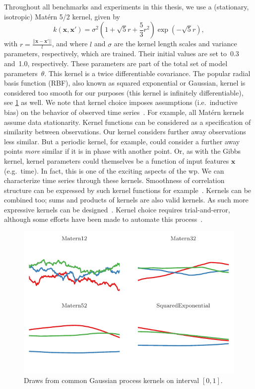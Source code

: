 Throughout all benchmarks and experiments in this thesis, we use a (stationary, isotropic) Matérn 5/2 kernel, given by
\begin{equation}
  \label{eq:matern}
  k(\textbf{x}, \textbf{x}') = \sigma^2 (1 + \sqrt{5} r + \frac53 r^2) \exp(-\sqrt{5}r),
\end{equation}
with $r = \frac{||\textbf{x} - \textbf{x}'||}{l}$, and where $l$ and $\sigma$ are the kernel length scales and variance parameters, respectively, which are trained.
Their initial values are set to~0.3 and~1.0, respectively.
These parameters are part of the total set of model parameters~$\theta$.
This kernel is a twice differentiable covariance.
The popular radial basis function (RBF), also known as squared exponential or Gaussian, kernel is considered too smooth for our purposes (this kernel is infinitely differentiable), see \cref{fig:kernel-draws} as well.
We note that kernel choice imposes assumptions (i.e.~inductive bias) on the behavior of observed time series~\parencite[see also][chapter 2]{Duvenaud2014}.
For example, all Matérn kernels assume data stationarity.
Kernel functions can be considered as a specification of similarity between observations.
Our kernel considers further away observations less similar.
But a periodic kernel, for example, could consider a further away points \emph{more} similar if it is in phase with another point.
Or, as with the Gibbs kernel, kernel parameters could themselves be a function of input features $\mathbf{x}$ (e.g.~time).
In fact, this is one of the exciting aspects of the \gls{wp}.
We can characterize time series through these kernels.
Smoothness of correlation structure can be expressed by such kernel functions for example~\parencite{Fyshe2012, Fox2015, Foti2019}.
Kernels can be combined too; sums and products of kernels are also valid kernels.
As such more expressive kernels can be designed~\parencite{Gonen2011}.
Kernel choice requires trial-and-error, although some efforts have been made to automate this process~\parencite[see e.g.][]{Steinruecken2019}.


\begin{figure}[t]
  \centering
  \includegraphics[width=\textwidth]{fig/studies/kernels}
  \caption{
    Draws from common Gaussian process kernels on interval $\left[ {0,1} \right]$.
  }
  \label{fig:kernel-draws}
\end{figure}


